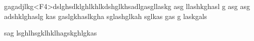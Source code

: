 gagadjlkg<F4>dslghsdklghlkhlkdshglkhsadlgasgllaskg asg llashkghasl g
asg asg adshklghaslg kas
gaslgkhaslkgha sglashglkah sglkas
gas
g
laskgals


sag lsghlhsgklhklhagskghlgkas
